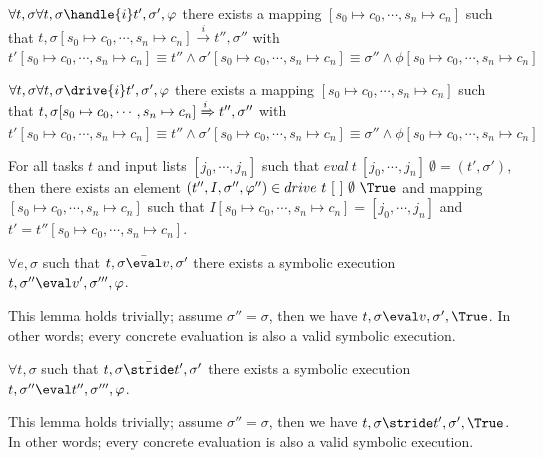 \begin{lemma}
  $\forall t,\sigma \forall t,\sigma\handle{i} t',\sigma',\phi$
  there exists a mapping $[s_0\mapsto c_0,\cdots,s_n\mapsto c_n]$
  such that $t,\sigma [s_0\mapsto c_0,\cdots,s_n\mapsto c_n] \xrightarrow[]{i} t'',\sigma''$
  with $t'[s_0\mapsto c_0,\cdots,s_n\mapsto c_n] \equiv t'' \wedge \sigma' [s_0\mapsto c_0,\cdots,s_n\mapsto c_n] \equiv \sigma'' \wedge \phi [s_0\mapsto c_0,\cdots,s_n\mapsto c_n]$
\end{lemma}


\begin{lemma}
  $\forall t,\sigma \forall t,\sigma\drive{i} t',\sigma',\phi$
  there exists a mapping $[s_0\mapsto c_0,\cdots,s_n\mapsto c_n]$
  such that $t,\sigma [s_0\mapsto c_0,\cdots,s_n\mapsto c_n] \xRightarrow[]{i} t'',\sigma''$
  with $t'[s_0\mapsto c_0,\cdots,s_n\mapsto c_n] \equiv t'' \wedge \sigma' [s_0\mapsto c_0,\cdots,s_n\mapsto c_n] \equiv \sigma'' \wedge \phi [s_0\mapsto c_0,\cdots,s_n\mapsto c_n]$
\end{lemma}


\begin{theorem}
For all tasks $t$ and input lists $[j_0,\cdots,j_n]$ such that $eval\ t\ [j_0,\cdots,j_n]\ \emptyset = (t',\sigma')$,
then there exists an element $(t'',I,\sigma'',\phi'')\in drive\ t\ [\ ]\ \emptyset\ \True$ and mapping $[s_0\mapsto c_0,\cdots,s_n\mapsto c_n]$ such that
$I[s_0\mapsto c_0,\cdots,s_n\mapsto c_n]=[j_0,\cdots,j_n]$ and $t'=t''[s_0\mapsto c_0,\cdots,s_n\mapsto c_n]$.
  \label{thm:complete}
\end{theorem}


\begin{lemma}
  $\forall e,\sigma$ such that $t,\sigma \bar{\eval}v,\sigma'$
  there exists a symbolic execution $t,\sigma''\eval v',\sigma''',\phi$.
\end{lemma}

This lemma holds trivially; assume $\sigma''=\sigma$, then we have $t,\sigma\eval v,\sigma',\True$. In other words; every concrete evaluation is also a valid symbolic execution.

\begin{lemma}
  $\forall t,\sigma$ such that $t,\sigma \bar{\stride}t',\sigma'$
  there exists a symbolic execution $t,\sigma''\eval t'',\sigma''',\phi$.
\end{lemma}

This lemma holds trivially; assume $\sigma''=\sigma$, then we have $t,\sigma\stride t',\sigma',\True$. In other words; every concrete evaluation is also a valid symbolic execution.

